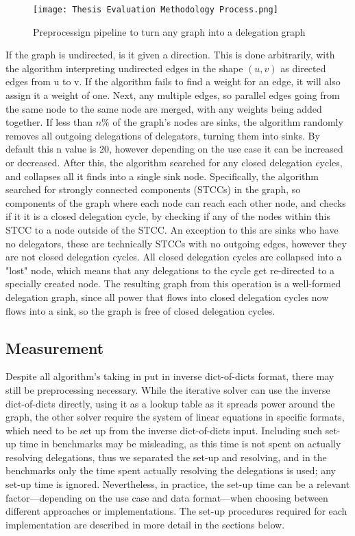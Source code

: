 \begin{figure}[t]
    \centering
    \texttt{[image: Thesis Evaluation Methodology Process.png]}
    \caption{Preprocessign pipeline to turn any graph into a delegation graph}
    \label{fig:cleaning_process}
\end{figure}

If the graph is undirected, is it given a direction. This is done arbitrarily, with the algorithm interpreting undirected edges in the shape $(u, v)$ as directed edges from u to v. If the algorithm fails to find a weight for an edge, it will also assign it a weight of one. Next, any multiple edges, so parallel edges going from the same node to the same node are merged, with any weights being added together. If less than $n\%$ of the graph's nodes are sinks, the algorithm randomly removes all outgoing delegations of delegators, turning them into sinks. By default this n value is 20, however depending on the use case it can be increased or decreased. After this, the algorithm searched for any closed delegation cycles, and collapses all it finds into a single sink node. Specifically, the algorithm searched for strongly connected components (STCCs) in the graph, so components of the graph where each node can reach each other node, and checks if it it is a closed delegation cycle, by checking if any of the nodes within this STCC to a node outside of the STCC. An exception to this are sinks who have no delegators, these are technically STCCs with no outgoing edges, however they are not closed delegation cycles. All closed delegation cycles are collapsed into a "lost" node, which means that any delegations to the cycle get re-directed to a specially created node. The resulting graph from this operation is a well-formed delegation graph, since all power that flows into closed delegation cycles now flows into a sink, so the graph is free of closed delegation cycles.

\subsection{Measurement}

Despite all algorithm's taking in put in inverse dict-of-dicts format, there may still be preprocessing necessary. While the iterative solver can use the inverse dict-of-dicts directly, using it as a lookup table as it spreads power around the graph, the other solver require the system of linear equations in specific formats, which need to be set up from the inverse dict-of-dicts input. Including such set-up time in benchmarks may be misleading, as this time is not spent on actually resolving delegations, thus we separated the set-up and resolving, and in the benchmarks only the time spent actually resolving the delegations is used; any set-up time is ignored. Nevertheless, in practice, the set-up time can be a relevant factor—depending on the use case and data format—when choosing between different approaches or implementations. The set-up procedures required for each implementation are described in more detail in the sections below.


